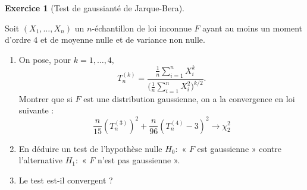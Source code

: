\documentclass[
  10,
  letterpaper,
  DIV=11,
  numbers=noendperiod]{scrreport}
\providecommand{\tightlist}{%
  \setlength{\itemsep}{0pt}\setlength{\parskip}{0pt}}\usepackage{longtable,booktabs,array}
\theoremstyle{plain}
\theoremstyle{definition}
\newtheorem{exercise}{Exercice}[chapter]
\theoremstyle{plain}
\theoremstyle{definition}
\theoremstyle{definition}
\theoremstyle{plain}
\theoremstyle{remark}
\begin{document}
\begin{exercise}[Test de gaussianté de
Jarque-Bera]\protect\hypertarget{exr-jarque}{}\label{exr-jarque}

Soit \((X_1,\dots, X_n)\) un \(n\)-échantillon de loi inconnue \(F\)
ayant au moins un moment d'ordre \(4\) et de moyenne nulle et de
variance non nulle.

\begin{enumerate}
\def\labelenumi{\arabic{enumi}.}
\tightlist
\item
  On pose, pour \(k= 1, \dots, 4,\)
  \[T_n^{(k)} = \frac{\tfrac{1}{n}\sum_{i = 1}^n X_i^k}{\big(\tfrac{1}{n}\sum_{i = 1}^n X_i^2\big)^{k/2}}.\]
  Montrer que si \(F\) est une distribution gaussienne, on a la
  convergence en loi suivante :
  \[\frac{n}{15}\left (T_n^{(3)}\right )^2+\frac{n}{96}\left(T_n^{(4)}-3\right)^2 \to \chi^2_2\]
\item
  En déduire un test de l'hypothèse nulle \(H_0:\) « \(F\) est
  gaussienne » contre l'alternative \(H_1:\) « \(F\) n'est pas
  gaussienne ».
\item
  Le test est-il convergent ?
\end{enumerate}

\end{exercise}
\end{document}
